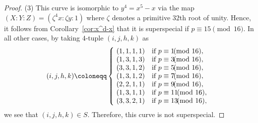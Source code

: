 \documentclass{article}
\theoremstyle{definition}
\begin{document}
\begin{proof}
\newpage
\hspace{5.8mm}(3) This curve is isomorphic to $y^4 = x^5-x$ via the map $(X:Y:Z) =(\zeta^4x:\zeta y:1)$ where $\zeta$ denotes a primitive $32$th root of unity.
Hence, it follows from Corollary~\ref{cor:x^d-x} that it is superspecial if $p \equiv 15 \pmod{16}$.
In all other cases, by taking $4$-tuple $(i,j,h,k)$ as\vspace{0.2mm}
\[
    (i,j,h,k) \coloneqq \left\{
        \begin{array}{ll}
            \!(1,1,1,1) & \text{if } p \equiv 1 \hspace{-2mm}\pmod{16},\\
            \!(1,3,1,3) & \text{if } p \equiv 3 \hspace{-2mm}\pmod{16},\\
            \!(3,3,1,2) & \text{if } p \equiv 5 \hspace{-2mm}\pmod{16},\\
            \!(1,3,1,2) & \text{if } p \equiv 7 \hspace{-2mm}\pmod{16},\\
            \!(2,2,1,1) & \text{if } p \equiv 9 \hspace{-2mm}\pmod{16},\\
            \!(1,3,1,1) & \text{if } p \equiv 11 \hspace{-2mm}\pmod{16},\\
            \!(3,3,2,1) & \text{if } p \equiv 13 \hspace{-2mm}\pmod{16},
        \end{array}
    \right.\vspace{-0.1mm}
\]
we see that $(i,j,h,k) \in S$.
Therefore, this curve is not superspecial.
\end{proof}
\end{document}
